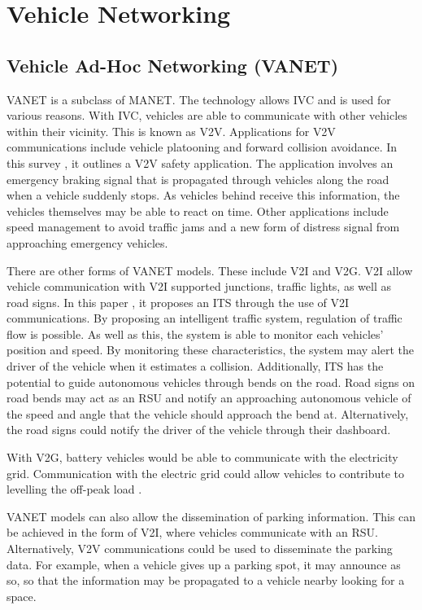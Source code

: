 \section{Vehicle Networking}
\subsection{Vehicle Ad-Hoc Networking (\ac{VANET})}
\ac{VANET} is a subclass of \ac{MANET}. The technology allows \ac{IVC} and is used for various reasons. With \ac{IVC}, vehicles are able to communicate with other vehicles within their vicinity. This is known as \ac{V2V}. Applications for \ac{V2V} communications include vehicle platooning and forward collision avoidance. In this survey \citep{Kiess2007OnCommunication}, it outlines a \ac{V2V} safety application. The application involves an emergency braking signal that is propagated through vehicles along the road when a vehicle suddenly stops. As vehicles behind receive this information, the vehicles themselves may be able to react on time. Other applications include speed management to avoid traffic jams and a new form of distress signal from approaching emergency vehicles.

There are other forms of \ac{VANET} models. These include \ac{V2I} and \ac{V2G}. \ac{V2I} allow vehicle communication with \ac{V2I} supported junctions, traffic lights, as well as road signs. In this paper \citep{Milanes2012AnSystem}, it proposes an \ac{ITS} through the use of \ac{V2I} communications. By proposing an intelligent traffic system, regulation of traffic flow is possible. As well as this, the system is able to monitor each vehicles' position and speed. By monitoring these characteristics, the system may alert the driver of the vehicle when it estimates a collision. Additionally, \ac{ITS} has the potential to guide autonomous vehicles through bends on the road. Road signs on road bends may act as an \ac{RSU} and notify an approaching autonomous vehicle of the speed and angle that the vehicle should approach the bend at. Alternatively, the road signs could notify the driver of the vehicle through their dashboard.

With \ac{V2G}, battery vehicles would be able to communicate with the electricity grid. Communication with the electric grid could allow vehicles to contribute to levelling the off-peak load \citep{Guille2009AImplementation}. 

\ac{VANET} models can also allow the dissemination of parking information. This can be achieved in the form of \ac{V2I}, where vehicles communicate with an \ac{RSU}. Alternatively, \ac{V2V} communications could be used to disseminate the parking data. For example, when a vehicle gives up a parking spot, it may announce as so, so that the information may be propagated to a vehicle nearby looking for a space.

